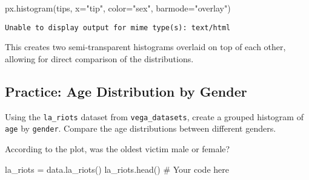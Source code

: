 \documentclass[
  letterpaper,
  DIV=11,
  numbers=noendperiod]{scrreprt}
\newenvironment{Shaded}{\begin{snugshade}}{\end{snugshade}}
\newcommand{\CommentTok}[1]{\textcolor[rgb]{0.37,0.37,0.37}{#1}}
\newcommand{\NormalTok}[1]{\textcolor[rgb]{0.00,0.23,0.31}{#1}}
\newcommand{\OperatorTok}[1]{\textcolor[rgb]{0.37,0.37,0.37}{#1}}
\newcommand{\StringTok}[1]{\textcolor[rgb]{0.13,0.47,0.30}{#1}}
\begin{document}
\begin{Shaded}
\begin{Highlighting}[]
\NormalTok{px.histogram(tips, x}\OperatorTok{=}\StringTok{"tip"}\NormalTok{, color}\OperatorTok{=}\StringTok{"sex"}\NormalTok{, barmode}\OperatorTok{=}\StringTok{"overlay"}\NormalTok{)}
\end{Highlighting}
\end{Shaded}

\begin{verbatim}
Unable to display output for mime type(s): text/html
\end{verbatim}

This creates two semi-transparent histograms overlaid on top of each
other, allowing for direct comparison of the distributions.

\begin{tcolorbox}[enhanced jigsaw, colframe=quarto-callout-tip-color-frame, opacityback=0, titlerule=0mm, bottomrule=.15mm, breakable, leftrule=.75mm, colbacktitle=quarto-callout-tip-color!10!white, title=\textcolor{quarto-callout-tip-color}{\faLightbulb}\hspace{0.5em}{Practice}, rightrule=.15mm, coltitle=black, opacitybacktitle=0.6, colback=white, left=2mm, arc=.35mm, toptitle=1mm, bottomtitle=1mm, toprule=.15mm]

\subsection{Practice: Age Distribution by
Gender}\label{practice-age-distribution-by-gender}

Using the \texttt{la\_riots} dataset from \texttt{vega\_datasets},
create a grouped histogram of \texttt{age} by \texttt{gender}. Compare
the age distributions between different genders.

According to the plot, was the oldest victim male or female?

\begin{Shaded}
\begin{Highlighting}[]
\NormalTok{la\_riots }\OperatorTok{=}\NormalTok{ data.la\_riots()}
\NormalTok{la\_riots.head()}
\CommentTok{\# Your code here}
\end{Highlighting}
\end{Shaded}


\end{tcolorbox}
\end{document}

